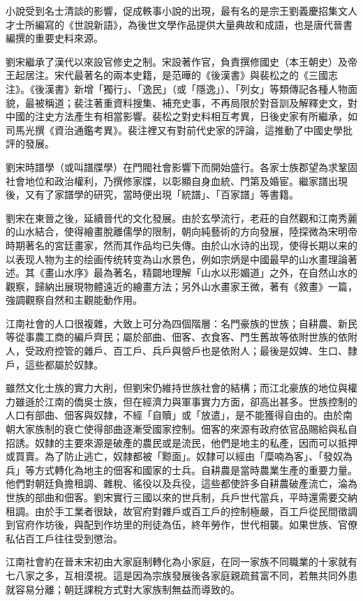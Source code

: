 小說受到名士清談的影響，促成軼事小說的出現，最有名的是宗王劉義慶招集文人才士所編寫的《世說新語》，為後世文學作品提供大量典故和成語，也是唐代晉書編撰的重要史料來源。

劉宋繼承了漢代以來設官修史之制。宋設著作官，負責撰修國史（本王朝史）及帝王起居注。宋代最著名的兩本史籍，是范曄的《後漢書》與裴松之的《三國志注》。《後漢書》新增「獨行」、「逸民」（或「隱逸」）、「列女」等類傳記各種人物面貌，最被稱道；裴注著重資料搜集、補充史事，不再局限於對音訓及解釋史文，對中國的注史方法產生有相當影響。裴松之對史料相互考異，日後史家有所繼承，如司馬光撰《資治通鑑考異》。裴注裡又有對前代史家的評論，這推動了中國史學批評的發展。

劉宋時譜學（或叫譜牒學）在門閥社會影響下而開始盛行。各家士族郡望為求鞏固社會地位和政治權利，乃撰修家牒，以彰顯自身血統、門第及婚宦。繼家譜出現後，又有了家譜學的研究，當時便出現「統譜」、「百家譜」等書籍。

劉宋在東晉之後，延續晉代的文化發展。由於玄學流行，老莊的自然觀和江南秀麗的山水結合，使得繪畫脫離儒學的限制，朝向純藝術的方向發展，陸探微為宋明帝時期著名的宮廷畫家，然而其作品均已失傳。由於山水诗的出现，使得长期以来的以表现人物为主的绘画传统转变為山水景色，例如宗炳是中國最早的山水畫理論著述。其《畫山水序》最為著名，精闢地理解「山水以形媚道」之外，在自然山水的觀察，歸納出展現物體遠近的繪畫方法；另外山水畫家王微，著有《敘畫》一篇，強調觀察自然和主觀能動作用。

江南社會的人口很複雜，大致上可分為四個階層：名門豪族的世族；自耕農、新民等從事農工商的編戶齊民；屬於部曲、佃客、衣食客、門生舊故等依附世族的依附人，受政府控管的雜戶、百工戶、兵戶與營戶也是依附人；最後是奴婢、生口、隸戶，這些都屬於奴隸。

雖然文化士族的實力大削，但劉宋仍維持世族社會的結構；而江北豪族的地位與權力雖遜於江南的僑吳士族，但在經濟力與軍事實力方面，卻高出甚多。世族控制的人口有部曲、佃客與奴隸，不經「自贖」或「放遣」，是不能獲得自由的。由於南朝大家族制的衰亡使得部曲逐漸受國家控制。佃客的來源有政府依官品賜給與私自招誘。奴隸的主要來源是破產的農民或是流民，他們是地主的私產，因而可以抵押或買賣。為了防止逃亡，奴隸都被「黥面」。奴隸可以經由「糜喃為客」、「發奴為兵」等方式轉化為地主的佃客和國家的士兵。自耕農是當時農業生產的重要力量。他們對朝廷負擔租調、雜稅、徭役以及兵役，這些都使許多自耕農破產流亡，淪為世族的部曲和佃客。劉宋實行三國以來的世兵制，兵戶世代當兵，平時還需要交納租調。由於手工業者很缺，故官府對雜戶或百工戶的控制極嚴，百工戶從民間徵調到官府作坊後，與配到作坊里的刑徒為伍，終年勞作，世代相襲。如果世族、官僚私佔百工戶往往受到懲治。

江南社會約在晉末宋初由大家庭制轉化為小家庭，在同一家族不同職業的十家就有七八家之多，互相漠視。這是因為宗族發展後各家庭親疏貧富不同，若無共同外患就容易分離；朝廷課稅方式對大家族制無益而導致的。












